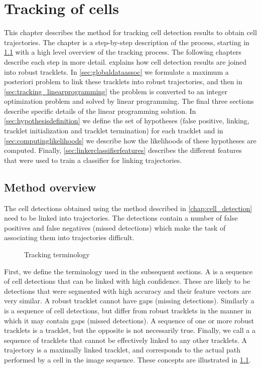 \chapter{Tracking of cells}
	\label{chap:tracking}
	
	This chapter describes the method for tracking cell detection results to obtain cell trajectories. The chapter is a step-by-step description of the process, starting in \cref{sec:tracking_overview} with a high level overview of the tracking process. The following chapters describe each step in more detail.  explains how cell detection results are joined into robust tracklets. In \cref{sec:globaldataassoc} we formulate a maximum a posteriori problem to link these tracklets into robust trajectories, and then in \cref{sec:tracking_linearprogramming} the problem is converted to an integer optimization problem and solved by linear programming. The final three sections describe specific details of the linear programming solution. In \cref{sec:hypothesisdefinition} we define the set of hypotheses (false positive, linking, tracklet initialization and tracklet termination) for each tracklet and in \cref{sec:computinglikelihoods} we describe how the likelihoods of these hypotheses are computed. Finally, \cref{sec:linkerclassifierfeatures} describes the different features that were used to train a classifier for linking trajectories.
	
	\section{Method overview}
		\label{sec:tracking_overview}
		
		The cell detections obtained using the method described in \cref{chap:cell_detection} need to be linked into trajectories. The detections contain a number of false positives and false negatives (missed detections) which make the task of associating them into trajectories difficult.
		
		\begin{figure}[h]
			\centering
			\caption{Tracking terminology}
			\label{fig:tracking_overview_terminology}
		\end{figure}
		
		First, we define the terminology used in the subsequent sections. A  is a sequence of cell detections that can be linked with high confidence. These are likely to be detections that were segmented with high accuracy and their feature vectors are very similar. A robust tracklet cannot have gaps (missing detections). Similarly a  is a sequence of cell detections, but differ from robust tracklets in the manner in which it may contain gaps (missed detections). A sequence of one or more robust tracklets is a tracklet, but the opposite is not necessarily true. Finally, we call a  a sequence of tracklets that cannot be effectively linked to any other tracklets. A trajectory is a maximally linked tracklet, and corresponds to the actual path performed by a cell in the image sequence. These concepts are illustrated in \cref{fig:tracking_overview_terminology}.
		
